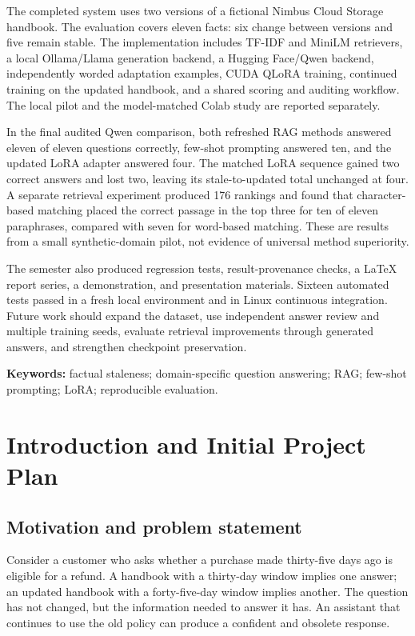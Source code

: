 \documentclass[11pt,letterpaper,oneside]{report}
\begin{document}
The completed system uses two versions of a fictional Nimbus Cloud Storage handbook. The evaluation covers eleven facts: six change between versions and five remain stable. The implementation includes TF-IDF and MiniLM retrievers, a local Ollama/Llama generation backend, a Hugging Face/Qwen backend, independently worded adaptation examples, CUDA QLoRA training, continued training on the updated handbook, and a shared scoring and auditing workflow. The local pilot and the model-matched Colab study are reported separately.

In the final audited Qwen comparison, both refreshed RAG methods answered eleven of eleven questions correctly, few-shot prompting answered ten, and the updated LoRA adapter answered four. The matched LoRA sequence gained two correct answers and lost two, leaving its stale-to-updated total unchanged at four. A separate retrieval experiment produced 176 rankings and found that character-based matching placed the correct passage in the top three for ten of eleven paraphrases, compared with seven for word-based matching. These are results from a small synthetic-domain pilot, not evidence of universal method superiority.

The semester also produced regression tests, result-provenance checks, a LaTeX report series, a demonstration, and presentation materials. Sixteen automated tests passed in a fresh local environment and in Linux continuous integration. Future work should expand the dataset, use independent answer review and multiple training seeds, evaluate retrieval improvements through generated answers, and strengthen checkpoint preservation.

\textbf{Keywords:} factual staleness; domain-specific question answering; RAG; few-shot prompting; LoRA; reproducible evaluation.
\tableofcontents
\clearpage{}

\chapter{Introduction and Initial Project Plan}
\section{Motivation and problem statement}
Consider a customer who asks whether a purchase made thirty-five days ago is eligible for a refund. A handbook with a thirty-day window implies one answer; an updated handbook with a forty-five-day window implies another. The question has not changed, but the information needed to answer it has. An assistant that continues to use the old policy can produce a confident and obsolete response.
\end{document}
